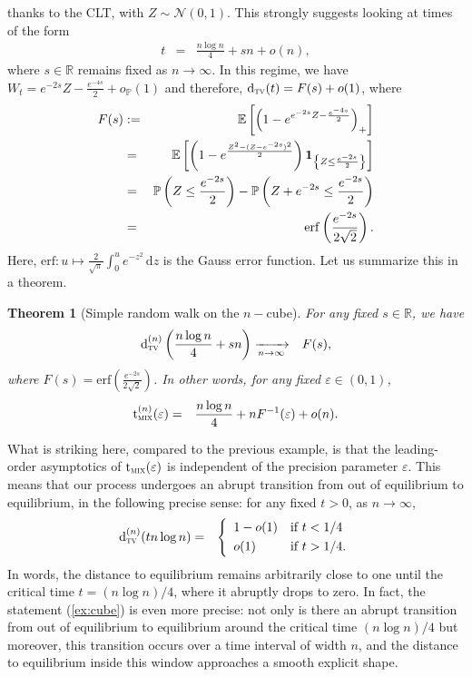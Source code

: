 \documentclass[12pt,final]{article}
\newtheorem{theorem}{Theorem}[section]
\numberwithin{equation}{section}
\newcommand{\dR}{\mathbb {R}}
\newcommand{\EE}{{\mathbb{E}}}
\newcommand{\PP}{{\mathbb{P}}}
\newcommand{\cN}{\mathcal {N}}
\newcommand{\dtv}{{\rm d}_{\textsc{tv}}}
\newcommand{\tmix}{{\rm t}_{\textsc{mix}}}
\begin{document}
thanks to the CLT, with $Z\sim\cN(0,1)$. This strongly suggests looking at times of the form
\begin{eqnarray*}
t & = & \frac{n\log n}{4} + sn+o(n),
\end{eqnarray*}
where $s\in\dR$ remains fixed as $n\to\infty$. In this regime, we have $W_t = e^{-2s} Z-\frac{e^{-4s}}{2}+o_\PP(1)$ and therefore, $\dtv(t)=F(s)+o(1)$, where
\begin{eqnarray*}
F(s) & := & \EE\left[\left(1-e^{e^{-2s} Z-\frac{e^{-4s}}{2}}\right)_+\right]\\
& = & \EE\left[\left(1-e^{\frac{Z^2-(Z-e^{-2s})^2}{2}}\right){\bf 1}_{\left\{Z\le \frac{e^{-2s}}{2}\right\}}\right]\\
& = & \PP\left(Z\le \frac{e^{-2s}}{2}\right)-\PP\left(Z+e^{-2s}\le \frac{e^{-2s}}{2}\right)\\
& = & \mathrm{erf}\left(\frac{e^{-2s}}{2\sqrt{2}}\right).
\end{eqnarray*}
Here, $\mathrm{erf}\colon u\mapsto \frac{2}{\sqrt{\pi}}\int_0^ue^{-z^2}\,\mathrm{d}z$ is the Gauss error function. Let us summarize this in a theorem. 
\begin{theorem}[Simple random walk on the $n-$cube]\label{th:ncube} For any fixed $s\in\dR$, we have
\begin{eqnarray*}
\dtv^{(n)}\left(\frac{n\log n}{4} + sn\right) & \xrightarrow[n\to\infty]{} & F(s),
\end{eqnarray*}
where $F(s)=\mathrm{erf}\left(\frac{e^{-2s}}{2\sqrt{2}}\right)$. In other words, for any fixed $\varepsilon\in(0,1)$,
\begin{eqnarray}
\label{ex:cube}
\tmix^{(n)}(\varepsilon) & = & \frac{n\log n}{4} +n F^{-1}(\varepsilon)+o(n).
\end{eqnarray}
\end{theorem} 
What is striking here, compared to the previous example, is that the leading-order asymptotics of $\tmix(\varepsilon)$ is independent of the precision parameter $\varepsilon$. This means that our process undergoes an abrupt transition from out of equilibrium to equilibrium, in the following precise sense: for any fixed $t>0$, as $n\to\infty$, 
\begin{eqnarray}
\label{cutoff:cube}
\dtv^{(n)}(tn\log n) & = & \left\{
\begin{array}{ll}
1-o(1) & \textrm{if }t<1/4\smallskip\\
o(1) & \textrm{if }t>1/4.
\end{array}
\right.
\end{eqnarray}
In words, the distance to equilibrium remains arbitrarily close to one until the critical time $t=(n\log n)/4$, where it abruptly drops to zero. In fact, the statement (\ref{ex:cube}) is even more precise: not only is there an abrupt transition from out of equilibrium to equilibrium  around the critical time $(n\log n)/4$ but moreover,  this transition occurs over a time interval of width $n$, and the distance to equilibrium inside this window approaches a smooth explicit shape. 
\end{document}
